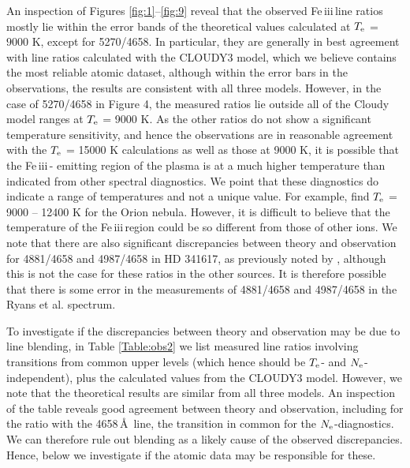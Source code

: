 \documentclass{emulateapj}
\newcommand\fe{Fe\,{\sc iii}\,}
\begin{document}
An inspection of Figures \ref{fig:1}--\ref{fig:9} reveal that the observed \fe line ratios 
mostly lie within the error bands of the theoretical values calculated at $T_{\rm e}$ = $9000$ K, except for 5270/4658. 
In particular, they are generally in best agreement with line ratios calculated with the CLOUDY3 model, which we believe contains the 
most reliable atomic dataset, although within the error bars in the observations, the results are consistent with all three models.
However, in the case of 5270/4658 in Figure 4, the measured ratios lie outside all of the Cloudy model ranges at $T_{\rm e}$ = 9000 K. As the other ratios do not show a significant temperature sensitivity, and hence the observations are in reasonable agreement 
with the $T_{\rm e}$ = 15000 K calculations as well as those at 9000 K, it is possible that the \fe - emitting region of the plasma 
is at a much higher temperature than indicated from other spectral diagnostics. We point that these diagnostics 
do indicate a range of temperatures and not a unique value. For example, \citet{1998MNRAS.295..401E} find $T_{\rm e}$ = 9000 -- 12400 K 
for the Orion nebula. However, it is difficult to believe that the temperature of the \fe region could be so different from
those of other ions. We note that there are also significant discrepancies between theory and observation for 4881/4658 and 4987/4658 in HD 341617, as previously noted by \citet{2003A&A...401.1119R}, although this is not the case for these ratios in the other sources. It is therefore possible that there is some error in the measurements of 4881/4658 and 4987/4658 in the Ryans et al. spectrum. 

To investigate if the discrepancies between theory and observation may be due to line blending, in Table \ref{Table:obs2}
we list measured line ratios involving transitions from common upper levels (which hence should be $T_{\rm e}$- and $N_{\rm e}$-independent), plus the calculated values from the CLOUDY3 model. However, we note that the theoretical results are similar from all three models.
An inspection of the table reveals good agreement between theory and observation, including for the ratio 
with the 4658\,\AA\ line, the transition in common for the $N_{\rm e}$-diagnostics. We can therefore rule out blending as a likely cause of the 
observed discrepancies. Hence, below we investigate if the atomic data may be responsible for these. 
\end{document}
